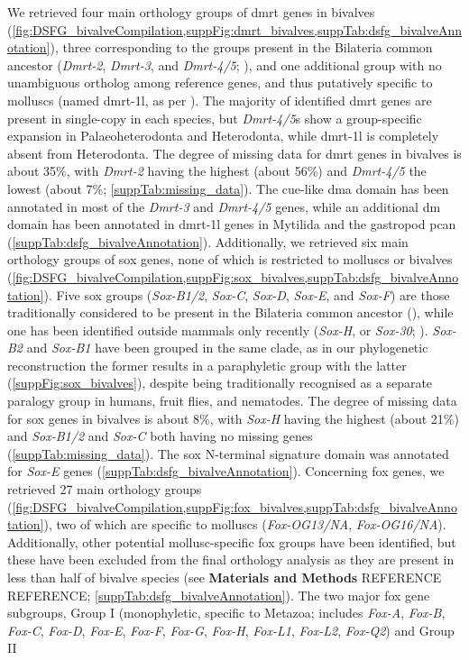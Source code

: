 We retrieved four main orthology groups of \gls{dmrt} genes in bivalves (\cref{fig:DSFG_bivalveCompilation,suppFig:dmrt_bivalves,suppTab:dsfg_bivalveAnnotation}), three corresponding to the groups present in the Bilateria common ancestor (\textit{Dmrt-2}, \textit{Dmrt-3}, and \textit{Dmrt-4/5}; \textbf{\cite{mawaribuchi2019independent}}), and one additional group with no unambiguous ortholog among reference genes, and thus putatively specific to molluscs (named \gls{dmrt-1l}, as per \textbf{\cite{li2018foxl2,evensen2022comparative}}). The majority of identified \gls{dmrt} genes are present in single-copy in each species, but \textit{Dmrt-4/5}s show a group-specific expansion in Palaeoheterodonta and Heterodonta, while \gls{dmrt-1l} is completely absent from Heterodonta. The degree of missing data for \gls{dmrt} genes in bivalves is about 35\%, with \textit{Dmrt-2} having the highest (about 56\%) and \textit{Dmrt-4/5} the lowest (about 7\%; \cref{suppTab:missing_data}). The \gls{cue}-like \gls{dma} domain has been annotated in most of the \textit{Dmrt-3} and \textit{Dmrt-4/5} genes, while an additional \gls{dm} domain has been annotated in \gls{dmrt-1l} genes in Mytilida and the gastropod \gls{pcan} (\cref{suppTab:dsfg_bivalveAnnotation}). Additionally, we retrieved six main orthology groups of \gls{sox} genes, none of which is restricted to molluscs or bivalves (\cref{fig:DSFG_bivalveCompilation,suppFig:sox_bivalves,suppTab:dsfg_bivalveAnnotation}). Five \gls{sox} groups (\textit{Sox-B1/2}, \textit{Sox-C}, \textit{Sox-D}, \textit{Sox-E}, and \textit{Sox-F}) are those traditionally considered to be present in the Bilateria common ancestor (\textbf{\cite{phochanukul2010no}}), while one has been identified outside mammals only recently (\textit{Sox-H}, or \textit{Sox-30}; \textbf{\cite{han2010characterization}}). \textit{Sox-B2} and \textit{Sox-B1} have been grouped in the same clade, as in our phylogenetic reconstruction the former results in a paraphyletic group with the latter (\cref{suppFig:sox_bivalves}), despite being traditionally recognised as a separate paralogy group in humans, fruit flies, and nematodes. The degree of missing data for \gls{sox} genes in bivalves is about 8\%, with \textit{Sox-H} having the highest (about 21\%) and \textit{Sox-B1/2} and \textit{Sox-C} both having no missing genes (\cref{suppTab:missing_data}). The \gls{sox} N-terminal signature domain was annotated for \textit{Sox-E} genes (\cref{suppTab:dsfg_bivalveAnnotation}). Concerning \gls{fox} genes, we retrieved 27 main orthology groups (\cref{fig:DSFG_bivalveCompilation,suppFig:fox_bivalves,suppTab:dsfg_bivalveAnnotation}), two of which are specific to molluscs (\textit{Fox-OG13/NA}, \textit{Fox-OG16/NA}). Additionally, other potential mollusc-specific \gls{fox} groups have been identified, but these have been excluded from the final orthology analysis as they are present in less than half of bivalve species (see \textbf{Materials and Methods} REFERENCE REFERENCE; \cref{suppTab:dsfg_bivalveAnnotation}). The two major \gls{fox} gene subgroups, Group I (monophyletic, specific to Metazoa; includes \textit{Fox-A}, \textit{Fox-B}, \textit{Fox-C}, \textit{Fox-D}, \textit{Fox-E}, \textit{Fox-F}, \textit{Fox-G}, \textit{Fox-H}, \textit{Fox-L1}, \textit{Fox-L2}, \textit{Fox-Q2}) and Group II 